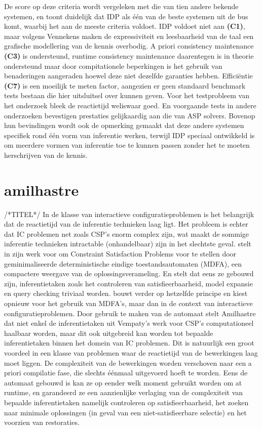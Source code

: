 De score op deze criteria wordt vergeleken met die van tien andere bekende systemen, en toont duidelijk dat IDP als \'{e}\'{e}n van de beste systemen uit de bus komt, waarbij het aan de meeste criteria voldoet. IDP voldoet niet aan \textbf{(C1)}, maar volgens Vennekens maken de expressiviteit en leesbaarheid van de taal een grafische modellering van de kennis overbodig. 
A priori consistency maintenance \textbf{(C3)} is ondersteund, runtime consistency maintenance daarentegen is in theorie ondersteund maar door compitationele beperkingen is het gebruik van benaderingen aangeraden hoewel deze niet dezelfde garanties hebben.
Effici\"{e}ntie \textbf{(C7)} is een moeilijk te meten factor, aangezien er geen standaard benchmark tests bestaan die hier uitsluitsel over kunnen geven. Voor het testprobleem van het onderzoek bleek de reactietijd weliswaar goed. En voorgaande tests in andere onderzoeken bevestigen prestaties gelijkaardig aan die van ASP solvers. 
Bovenop hun bevindingen wordt ook de opmerking gemaakt dat deze andere systemen specifiek rond \'{e}\'{e}n vorm van inferentie werken, terwijl IDP speciaal ontwikkeld is om meerdere vormen van inferentie toe te kunnen passen zonder het te moeten herschrijven van de kennis.

\section{amilhastre}
/*TITEL*/
In de klasse van interactieve configuratieproblemen is het belangrijk dat de reactietijd van de inferentie technieken laag ligt. Het probleem is echter dat IC problemen net zoals CSP's enorm complex zijn, wat maakt de sommige inferentie technieken intractable (onhandelbaar) zijn in het slechtste geval. \citep{vempaty1992solving} stelt in zijn werk voor om Constraint Satisfaction Problems voor te stellen door geminimaliseerde deterministische eindige toestandsautomaten (MDFA), een compactere weergave van de oplossingsverameling. En stelt dat eens ze gebouwd zijn, inferentietaken zoals het controleren van satisfieerbaarheid, model expansie en query checking triviaal worden. \citep{amilhastre2002consistency} bouwt verder op hetzelfde principe en kiest opnieuw voor het gebruik van MDFA's, maar dan in de context van interactieve configuratieproblemen. Door gebruik te maken van de automaat stelt Amilhastre dat niet enkel de inferentietaken uit Vempaty's werk voor CSP's computationeel haalbaar worden, maar dit ook uitgebreid kan worden tot bepaalde inferentietaken binnen het domein van IC problemen. Dit is natuurlijk een groot voordeel in een klasse van problemen waar de reactietijd van de bewerkingen laag moet liggen. De complexiteit van de bewerkingen worden verschoven naar een a priori compilatie fase, die slechts \'{e}\'{e}nmaal uitgevoerd hoeft te worden. Eens de automaat gebouwd is kan ze op eender welk moment gebruikt worden om at runtime, en garandeerd ze een aanzienlijke verlaging van de complexiteit van bepaalde inferentietaken namelijk controleren op satisfieerbaarheid, het zoeken naar minimale oplossingen (in geval van een niet-satisfieerbare selectie) en het voorzien van restoraties. 

